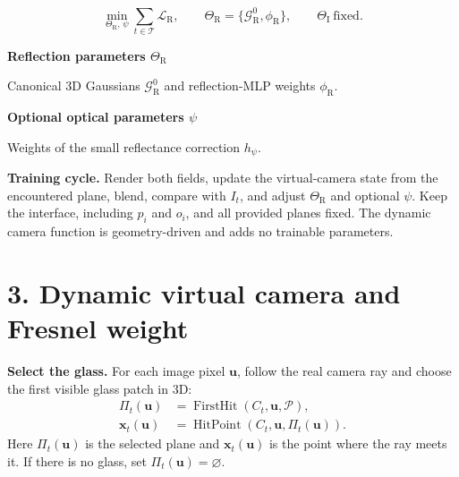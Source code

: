 \documentclass[10pt,a4paper]{article}
\newcommand{\notation}[2]{\noindent\textbf{#1}\par\nopagebreak #2\par}
\newcommand{\GR}{\mathcal G_{\mathrm R}}
\newcommand{\uu}{\mathbf u}
\newcommand{\notepair}[4]{\par\noindent
\begin{minipage}[t]{0.485\textwidth}\small\notation{#1}{#2}\end{minipage}\hfill
\begin{minipage}[t]{0.485\textwidth}\small\notation{#3}{#4}\end{minipage}\par\vspace{1pt}}
\begin{document}
\begin{equation}
\boxed{\min_{\Theta_{\mathrm R},\,\psi}\sum_{t\in\mathcal T}\mathcal L_{\mathrm R}},
\qquad \Theta_{\mathrm R}=\{\GR^0,\phi_{\mathrm R}\},
\qquad \Theta_{\mathrm I}\ \text{fixed}. \tag{8}
\end{equation}
\notepair{Reflection parameters $\Theta_{\mathrm R}$}{Canonical 3D Gaussians $\GR^0$ and reflection-MLP weights $\phi_{\mathrm R}$.}
{Optional optical parameters $\psi$}{Weights of the small reflectance correction $h_\psi$.}
\textbf{Training cycle.} Render both fields, update the virtual-camera state from the encountered plane, blend, compare with $I_t$, and adjust $\Theta_{\mathrm R}$ and optional $\psi$. Keep the interface, including $p_i$ and $o_i$, and all provided planes fixed. The dynamic camera function is geometry-driven and adds no trainable parameters.

\section*{3. Dynamic virtual camera and Fresnel weight}
\textbf{Select the glass.} For each image pixel $\uu$, follow the real
camera ray and choose the first visible glass patch in 3D:
\begin{equation}
\boxed{\begin{aligned}
\Pi_t(\uu)&=\operatorname{FirstHit}(C_t,\uu,\mathcal P),\\[-1pt]
\mathbf x_t(\uu)&=\operatorname{HitPoint}(C_t,\uu,\Pi_t(\uu)).
\end{aligned}}\tag{9}\label{eq:pickplane}
\end{equation}
Here $\Pi_t(\uu)$ is the selected plane and $\mathbf x_t(\uu)$ is the
point where the ray meets it. If there is no glass, set
$\Pi_t(\uu)=\varnothing$.
\end{document}
